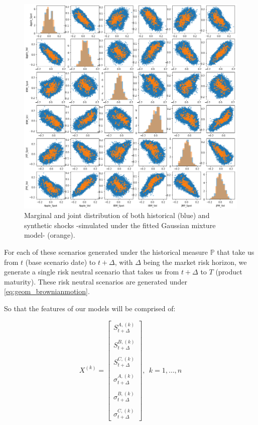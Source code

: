 \begin{figure}[H] 
\centering
\includegraphics[width=1.0\textwidth]{Figures/MarketRisk/GaussMixture.png}
\caption{Marginal and joint distribution of both historical (blue) and synthetic shocks -simulated under the fitted Gaussian mixture model- (orange).}
\label{fig:distrib_P_simul}
\end{figure}

For each of these scenarios generated under the historical measure $\mathbb{P}$ that take us from $t$ (base scenario date) to $t+\Delta$, with $\Delta$ being the market risk horizon, we generate a single risk neutral scenario that takes us from $t+\Delta$ to $T$ (product maturity). These risk neutral scenarios are generated under \ref{eq:geom_brownianmotion}. 

So that the features of our models will be comprised of:

$$
X^{(k)}=\left[\begin{array}{c}
S_{t+\Delta}^{A,(k)} \\ \\
S_{t+\Delta}^{B,(k)} \\ \\
S_{t+\Delta}^{C,(k)} \\ \\
\sigma_{t+\Delta}^{A,(k)} \\ \\
\sigma_{t+\Delta}^{B,(k)} \\ \\
\sigma_{t+\Delta}^{C,(k)}
\end{array}\right], \ \  k=1, \ldots, n
$$

